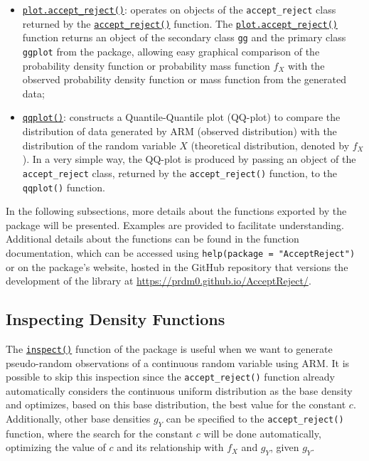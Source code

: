 \begin{itemize}
\item
  \href{https://prdm0.github.io/AcceptReject/reference/plot.accept_reject.html}{\texttt{plot.accept\_reject()}}: operates on objects of the \texttt{accept\_reject} class returned by the \href{https://prdm0.github.io/AcceptReject/reference/accept_reject.html}{\texttt{accept\_reject()}} function. The \href{https://prdm0.github.io/AcceptReject/reference/plot.accept_reject.html}{\texttt{plot.accept\_reject()}} function returns an object of the secondary class \texttt{gg} and the primary class \texttt{ggplot} from the  package, allowing easy graphical comparison of the probability density function or probability mass function \(f_X\) with the observed probability density function or mass function from the generated data;
\item
  \href{https://prdm0.github.io/AcceptReject/reference/qqplot.html}{\texttt{qqplot()}}: constructs a Quantile-Quantile plot (QQ-plot) to compare the distribution of data generated by ARM (observed distribution) with the distribution of the random variable \(X\) (theoretical distribution, denoted by \(f_X\)). In a very simple way, the QQ-plot is produced by passing an object of the \texttt{accept\_reject} class, returned by the \texttt{accept\_reject()} function, to the \texttt{qqplot()} function.
\end{itemize}

In the following subsections, more details about the functions exported by the  package will be presented. Examples are provided to facilitate understanding. Additional details about the functions can be found in the function documentation, which can be accessed using \texttt{help(package\ =\ "AcceptReject")} or on the package's website, hosted in the GitHub repository that versions the development of the library at \url{https://prdm0.github.io/AcceptReject/}.

\subsection{Inspecting Density Functions}\label{inspecting-density-functions}

The \href{https://prdm0.github.io/AcceptReject/reference/inspect.html}{\texttt{inspect()}} function of the  package is useful when we want to generate pseudo-random observations of a continuous random variable using ARM. It is possible to skip this inspection since the \texttt{accept\_reject()} function already automatically considers the continuous uniform distribution as the base density and optimizes, based on this base distribution, the best value for the constant \(c\). Additionally, other base densities \(g_Y\) can be specified to the \texttt{accept\_reject()} function, where the search for the constant \(c\) will be done automatically, optimizing the value of \(c\) and its relationship with \(f_X\) and \(g_Y\), given \(g_Y\).

